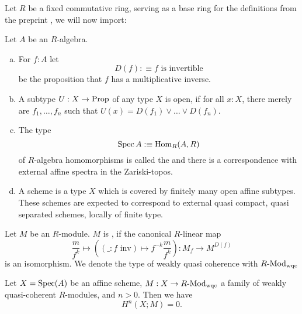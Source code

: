 
Let $R$ be a fixed commutative ring,
serving as a base ring for the definitions from the preprint \cite{draft},
we will now import:

\begin{definition}
  Let $A$ be an $R$-algebra.
  \begin{enumerate}[(a)]
  \item For $f:A$ let
    \[
      D(f):\equiv \text{$f$ is invertible}
    \]
    be the proposition that $f$ has a multiplicative inverse.
  \item A subtype $U:X\to \mathrm{Prop}$ of any type $X$ is open,
    if for all $x:X$, there merely are $f_1,\dots,f_n$ such that $U(x)=D(f_1)\vee \dots \vee D(f_n)$.
  \item The type
    \[
      \operatorname{Spec} A :\equiv \mathrm{Hom}_{R}(A,R)
    \]
    of $R$-algebra homomorphisms is called the 
    and there is a correspondence with external affine spectra in the Zariski-topos.
  \item A scheme is a type $X$ which is covered by finitely many open affine subtypes.
    These schemes are expected to correspond to
    external quasi compact, quasi separated schemes, locally of finite type.
  \end{enumerate}
\end{definition}

\begin{definition}
  Let $M$ be an $R$-module.
  $M$ is , if the canonical $R$-linear map
  \[
    \frac{m}{f^k}\mapsto ((\_: f\text{ inv})\mapsto f^{-k}\frac{m}{f^k}):M_f\to M^{D(f)}
  \]
  is an isomorphism.
  We denote the type of weakly quasi coherence with $R\text{-}\mathrm{Mod}_{\text{wqc}}$
\end{definition}

\begin{theorem}
  \label{affine-vanishing}
Let $X = \operatorname{Spec}(A)$ be an affine scheme, 
$M : X \to R\text{-}\mathrm{Mod}_{\text{wqc}}$ a family of weakly quasi-coherent $R$-modules,
and $n > 0$.
Then we have
	\[
		H^n(X;M) = 0.
		\]
\end{theorem}

